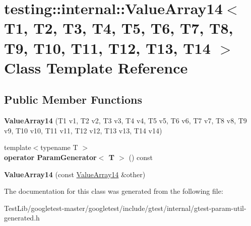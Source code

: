 \hypertarget{classtesting_1_1internal_1_1ValueArray14}{}\section{testing\+:\+:internal\+:\+:Value\+Array14$<$ T1, T2, T3, T4, T5, T6, T7, T8, T9, T10, T11, T12, T13, T14 $>$ Class Template Reference}
\label{classtesting_1_1internal_1_1ValueArray14}
\subsection*{Public Member Functions}
\begin{DoxyCompactItemize}
\item 
\mbox{\label{classtesting_1_1internal_1_1ValueArray14_a07a09d64aba1260d403adc661546ce48}} 
{\bfseries Value\+Array14} (T1 v1, T2 v2, T3 v3, T4 v4, T5 v5, T6 v6, T7 v7, T8 v8, T9 v9, T10 v10, T11 v11, T12 v12, T13 v13, T14 v14)
\item 
\mbox{\label{classtesting_1_1internal_1_1ValueArray14_aef77c9d7520c7313e2af66fd79185698}} 
{\footnotesize template$<$typename T $>$ }\\{\bfseries operator Param\+Generator$<$ T $>$} () const
\item 
\mbox{\label{classtesting_1_1internal_1_1ValueArray14_a41d4f0e6d12c86df58b24992a06300dc}} 
{\bfseries Value\+Array14} (const \hyperlink{classtesting_1_1internal_1_1ValueArray14}{Value\+Array14} \&other)
\end{DoxyCompactItemize}


The documentation for this class was generated from the following file\+:\begin{DoxyCompactItemize}
\item 
Test\+Lib/googletest-\/master/googletest/include/gtest/internal/gtest-\/param-\/util-\/generated.\+h\end{DoxyCompactItemize}
